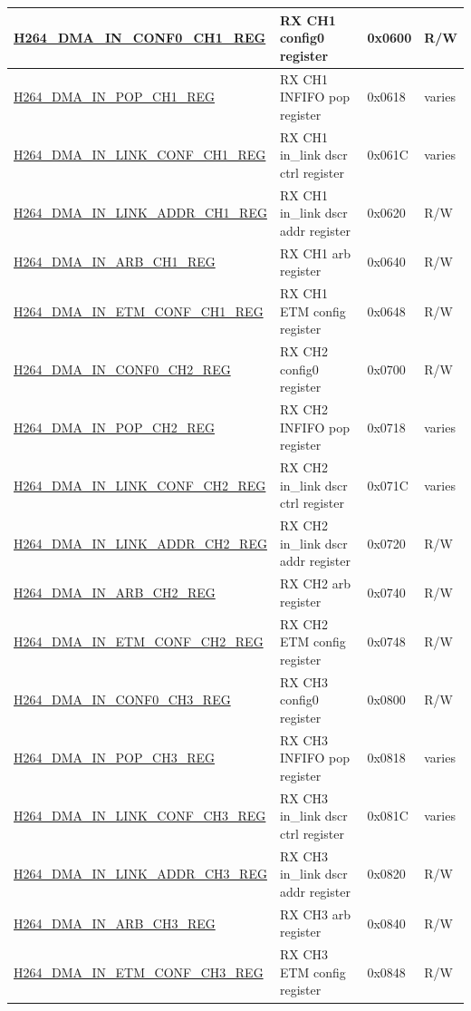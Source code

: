 \begin{longtable}{ | p{7.5cm} | p{5.7cm} | p{1.2cm} | p{1cm} | }
    \hyperref[regdesc:H264DMAINCONF0CH1REG]{H264\_DMA\_IN\_CONF0\_CH1\_REG} & RX CH1 config0 register & 0x0600 & R/W \\ \hline
    \hyperref[regdesc:H264DMAINPOPCH1REG]{H264\_DMA\_IN\_POP\_CH1\_REG} & RX CH1 INFIFO pop register & 0x0618 & varies \\ \hline
    \hyperref[regdesc:H264DMAINLINKCONFCH1REG]{H264\_DMA\_IN\_LINK\_CONF\_CH1\_REG} & RX CH1 in\_link dscr ctrl register & 0x061C & varies \\ \hline
    \hyperref[regdesc:H264DMAINLINKADDRCH1REG]{H264\_DMA\_IN\_LINK\_ADDR\_CH1\_REG} & RX CH1 in\_link dscr addr register & 0x0620 & R/W \\ \hline
    \hyperref[regdesc:H264DMAINARBCH1REG]{H264\_DMA\_IN\_ARB\_CH1\_REG} & RX CH1 arb register & 0x0640 & R/W \\ \hline
    \hyperref[regdesc:H264DMAINETMCONFCH1REG]{H264\_DMA\_IN\_ETM\_CONF\_CH1\_REG} & RX CH1 ETM config register & 0x0648 & R/W \\ \hline
    
    \hyperref[regdesc:H264DMAINCONF0CH2REG]{H264\_DMA\_IN\_CONF0\_CH2\_REG} & RX CH2 config0 register & 0x0700 & R/W \\ \hline
    \hyperref[regdesc:H264DMAINPOPCH2REG]{H264\_DMA\_IN\_POP\_CH2\_REG} & RX CH2 INFIFO pop register & 0x0718 & varies \\ \hline
    \hyperref[regdesc:H264DMAINLINKCONFCH2REG]{H264\_DMA\_IN\_LINK\_CONF\_CH2\_REG} & RX CH2 in\_link dscr ctrl register & 0x071C & varies \\ \hline
    \hyperref[regdesc:H264DMAINLINKADDRCH2REG]{H264\_DMA\_IN\_LINK\_ADDR\_CH2\_REG} & RX CH2 in\_link dscr addr register & 0x0720 & R/W \\ \hline
    \hyperref[regdesc:H264DMAINARBCH2REG]{H264\_DMA\_IN\_ARB\_CH2\_REG} & RX CH2 arb register & 0x0740 & R/W \\ \hline
    \hyperref[regdesc:H264DMAINETMCONFCH2REG]{H264\_DMA\_IN\_ETM\_CONF\_CH2\_REG} & RX CH2 ETM config register & 0x0748 & R/W \\ \hline
    
    \hyperref[regdesc:H264DMAINCONF0CH3REG]{H264\_DMA\_IN\_CONF0\_CH3\_REG} & RX CH3 config0 register & 0x0800 & R/W \\ \hline
    \hyperref[regdesc:H264DMAINPOPCH3REG]{H264\_DMA\_IN\_POP\_CH3\_REG} & RX CH3 INFIFO pop register & 0x0818 & varies \\ \hline
    \hyperref[regdesc:H264DMAINLINKCONFCH3REG]{H264\_DMA\_IN\_LINK\_CONF\_CH3\_REG} & RX CH3 in\_link dscr ctrl register & 0x081C & varies \\ \hline
    \hyperref[regdesc:H264DMAINLINKADDRCH3REG]{H264\_DMA\_IN\_LINK\_ADDR\_CH3\_REG} & RX CH3 in\_link dscr addr register & 0x0820 & R/W \\ \hline
    \hyperref[regdesc:H264DMAINARBCH3REG]{H264\_DMA\_IN\_ARB\_CH3\_REG} & RX CH3 arb register & 0x0840 & R/W \\ \hline
    \hyperref[regdesc:H264DMAINETMCONFCH3REG]{H264\_DMA\_IN\_ETM\_CONF\_CH3\_REG} & RX CH3 ETM config register & 0x0848 & R/W \\ \hline
    

\end{longtable}
